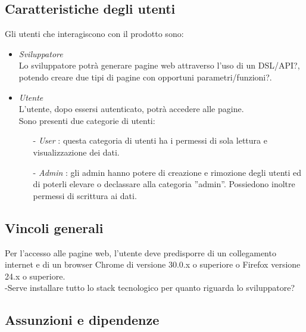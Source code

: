	\subsection{Caratteristiche degli utenti}
	Gli utenti che interagiscono con il prodotto sono:
	\begin{itemize}
	 \item \emph{Sviluppatore} \\
	        Lo sviluppatore potrà generare pagine web attraverso l'uso di un DSL/API?, potendo creare due tipi di pagine con
	        opportuni parametri/funzioni?.
	  \item \emph{Utente} \\
	  		L'utente, dopo essersi autenticato, potrà accedere alle pagine.\\
	  		Sono presenti due categorie di utenti: 		
	  		\begin{itemize}
	  		\item[-] \emph{User} : questa categoria di utenti ha i permessi di sola lettura e visualizzazione dei dati.
	  		\item[-] \emph{Admin} : gli admin hanno potere di creazione e rimozione degli utenti ed di poterli elevare o declassare
	  		                        alla categoria ''admin''.
	  								Possiedono inoltre permessi di scrittura ai dati.
	  		\end{itemize}
	\end{itemize}
	
	\subsection{Vincoli generali}
	Per l'accesso alle pagine web, l'utente deve predisporre di un collegamento internet e di un browser Chrome di versione 30.0.x o
	superiore o Firefox versione 24.x o superiore.
	\\ -Serve installare tutto lo stack tecnologico per quanto riguarda lo sviluppatore?

	\subsection{Assunzioni e dipendenze}

